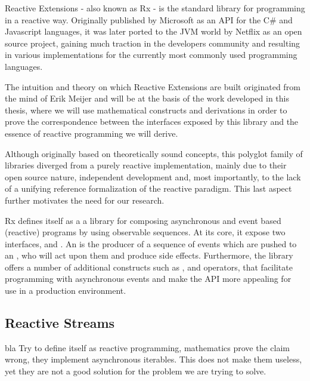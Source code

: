 Reactive Extensions - also known as Rx - is the standard library for programming in a reactive way. Originally published by Microsoft as an API for the C\# and Javascript languages, it was later ported to the JVM world by Netflix as an open source project, gaining much traction in the developers community and resulting in various implementations for the currently most commonly used programming languages\cite{ReactiveX}.

The intuition and theory on which Reactive Extensions are built originated from the mind of Erik Meijer\cite{meijer2010observable} and will be at the basis of the work developed in this thesis, where we will use mathematical constructs and derivations in order to prove the correspondence between the interfaces exposed by this library and the essence of reactive programming we will derive.

Although originally based on theoretically sound concepts, this polyglot family of libraries diverged from a purely reactive implementation, mainly due to their open source nature, independent development and, most importantly, to the lack of a unifying reference formalization of the reactive paradigm. This last aspect further motivates the need for our research.

Rx defines itself as a a library for composing asynchronous and event based (reactive) programs by using observable sequences\cite{Rx.Net}. At its core, it expose two interfaces,  and . An  is the producer of a sequence of events which are pushed to an , who will act upon them and produce side effects. Furthermore, the library offers a number of additional constructs such as ,  and operators, that facilitate programming with asynchronous events and make the API more appealing for use in a production environment.

\subsection{Reactive Streams}

bla\cite{meijer2014reactive}
Try to define itself as reactive programming, mathematics prove the claim wrong, they implement asynchronous iterables. This does not make them useless, yet they are not a good solution for the problem we are trying to solve.



